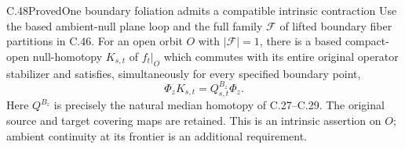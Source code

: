 \begin{claim}{C.48}{Proved}{One boundary foliation admits a compatible intrinsic contraction}
Use the based ambient-null plane loop and the full family
$\mathscr F$ of lifted boundary fiber partitions in C.46.
For an open orbit $O$ with $|\mathscr F|=1$, there is a based
compact-open null-homotopy $K_{s,t}$ of $f_t|_O$ which
commutes with its entire original operator stabilizer and
satisfies, simultaneously for every specified boundary point,
\[
                 \Phi_zK_{s,t}=Q^{B_z}_{s,t}\Phi_z.
                                                        \tag{C.48.1}
\]
Here $Q^{B_z}$ is precisely the natural median homotopy of
C.27--C.29. The original source and target covering maps are
retained. This is an intrinsic assertion on $O$; ambient
continuity at its frontier is an additional requirement.
\end{claim}


